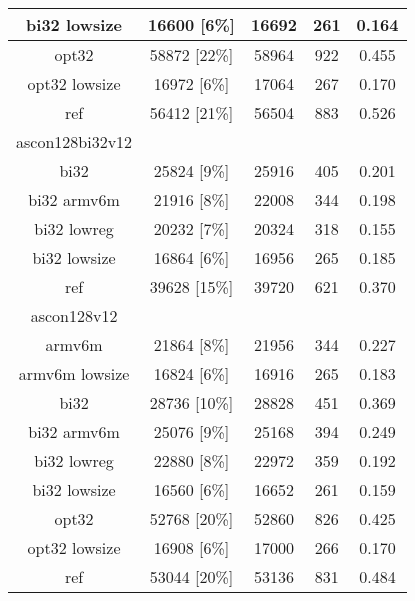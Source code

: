 \begin{table}[h]
\begin{tabular}{|c|c|c|c|c|}
        \hline
        bi32 lowsize & 16600 [6\%] & 16692 & 261 & 0.164 \\
        \hline
        opt32 & 58872 [22\%] & 58964 & 922 & 0.455 \\
        \hline
        opt32 lowsize & 16972 [6\%] & 17064 & 267 & 0.170 \\
        \hline
        ref & 56412 [21\%] & 56504 & 883 & 0.526 \\
        \hline
        ascon128bi32v12 & & & & \\
        \hline
        bi32 & 25824 [9\%] & 25916 & 405 & 0.201 \\
        \hline
        bi32 armv6m & 21916 [8\%] & 22008 & 344 & 0.198 \\
        \hline
        bi32 lowreg & 20232 [7\%] & 20324 & 318 & 0.155 \\
        \hline
        bi32 lowsize & 16864 [6\%] & 16956 & 265 & 0.185 \\
        \hline
        ref & 39628 [15\%] & 39720 & 621 & 0.370 \\
        \hline
        ascon128v12 & & & & \\
        \hline
        armv6m & 21864 [8\%] & 21956 & 344 & 0.227 \\
        \hline
        armv6m lowsize & 16824 [6\%] & 16916 & 265 & 0.183 \\
        \hline
        bi32 & 28736 [10\%] & 28828 & 451 & 0.369 \\
        \hline
        bi32 armv6m & 25076 [9\%] & 25168 & 394 & 0.249 \\
        \hline
        bi32 lowreg & 22880 [8\%] & 22972 & 359 & 0.192 \\
        \hline
        bi32 lowsize & 16560 [6\%] & 16652 & 261 & 0.159 \\
        \hline
        opt32 & 52768 [20\%] & 52860 & 826 & 0.425 \\
        \hline
        opt32 lowsize & 16908 [6\%] & 17000 & 266 & 0.170 \\
        \hline
        ref & 53044 [20\%] & 53136 & 831 & 0.484 \\
        \hline
    \end{tabular}
\end{table}

